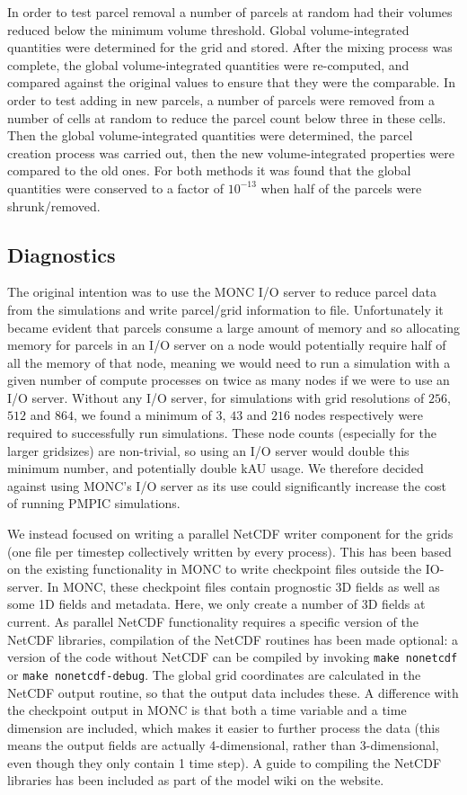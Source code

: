 \documentclass{article}
\begin{document}
In order to test parcel removal a number of parcels at random had their volumes reduced below the minimum volume threshold. Global volume-integrated quantities were determined for the grid and stored. After the mixing process was complete, the global volume-integrated quantities were re-computed, and compared against the original values to ensure that they were the comparable. In order to test adding in new parcels, a number of parcels were removed from a number of cells at random to reduce the parcel count below three in these cells. Then the global volume-integrated quantities were determined, the parcel creation process was carried out, then the new volume-integrated properties were compared to the old ones. For both methods it was found that the global quantities were conserved to a factor of $10^{-13}$ when half of the parcels were shrunk/removed.

\subsection{Diagnostics}

The original intention was to use the MONC I/O server to reduce parcel data from the simulations and write parcel/grid information to file. Unfortunately it became evident that parcels consume a large amount of memory and so allocating memory for parcels in an I/O server on a node would potentially require half of all the memory of that node, meaning we would need to run a simulation with a given number of compute processes on twice as many nodes if we were to use an I/O server. Without any I/O server, for simulations with grid resolutions of $256$, $512$ and $864$, we found a minimum of $3$, $43$ and $216$ nodes respectively were required to successfully run simulations. These node counts (especially for the larger gridsizes) are non-trivial, so using an I/O server would double this minimum number, and potentially double kAU usage. We therefore decided against using MONC's I/O server as its use could significantly increase the cost of running PMPIC simulations.

We instead focused on writing a parallel NetCDF writer component for the grids (one file per timestep collectively written by every process). This has been based on the existing functionality in MONC to write checkpoint files outside the IO-server. In MONC, these checkpoint files contain prognostic 3D fields as well as some 1D fields and metadata. Here, we only create a number of 3D fields at current. As parallel NetCDF functionality requires a specific version of the NetCDF libraries, compilation of the NetCDF routines has been made optional: a version of the code without NetCDF can be compiled by invoking \verb|make nonetcdf| or \verb|make nonetcdf-debug|. The global grid coordinates are calculated in the NetCDF output routine, so that the output data includes these. A difference with the checkpoint output in MONC is that both a time variable and a time dimension are included, which makes it easier to further process the data (this means the output fields are actually 4-dimensional, rather than 3-dimensional, even though they only contain 1 time step). A guide to compiling the NetCDF libraries has been included as part of the model wiki on the website. 
\end{document}

